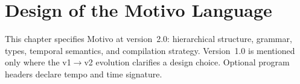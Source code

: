 \chapter{Design of the Motivo Language}\label{ch:language-design}

This chapter specifies Motivo at version~2.0: hierarchical structure, grammar, types, temporal semantics, and
compilation strategy.
Version~1.0 is mentioned only where the v1$\to$v2 evolution clarifies a design choice.
Optional program headers declare tempo and time signature.








